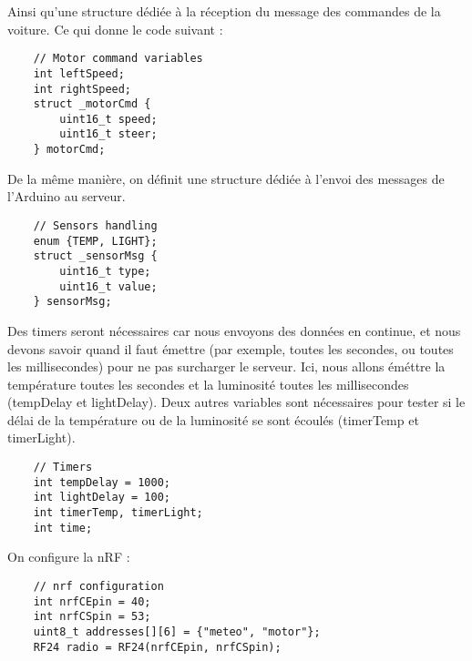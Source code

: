 Ainsi qu'une structure dédiée à la réception du message des commandes
de la voiture. Ce qui donne le code suivant :

\bigbreak
\begin{DDbox}{\linewidth}
\begin{lstlisting}
	// Motor command variables
	int leftSpeed;
	int rightSpeed;
	struct _motorCmd {
		uint16_t speed;
		uint16_t steer;
	} motorCmd;

\end{lstlisting}
\end{DDbox}

De la même manière, on définit une structure dédiée à l'envoi des messages
de l'Arduino au serveur.

\bigbreak
\begin{DDbox}{\linewidth}
\begin{lstlisting}
	// Sensors handling
	enum {TEMP, LIGHT};
	struct _sensorMsg {
		uint16_t type;
		uint16_t value;
	} sensorMsg;

\end{lstlisting}
\end{DDbox}

Des timers seront nécessaires car nous envoyons des données en continue, et nous devons
savoir quand il faut émettre (par exemple, toutes les secondes, ou toutes les millisecondes)
pour ne pas surcharger le serveur. Ici, nous allons éméttre la température toutes les secondes
et la luminosité toutes les millisecondes (tempDelay et lightDelay). 
Deux autres variables sont nécessaires pour tester si le délai de la température ou de la
luminosité se sont écoulés (timerTemp et timerLight).

\bigbreak
\begin{DDbox}{\linewidth}
\begin{lstlisting}
	// Timers
	int tempDelay = 1000;
	int lightDelay = 100;
	int timerTemp, timerLight;
	int time;

\end{lstlisting}
\end{DDbox}

On configure la nRF :

\bigbreak
\begin{DDbox}{\linewidth}
\begin{lstlisting}
	// nrf configuration
	int nrfCEpin = 40;
	int nrfCSpin = 53;
	uint8_t addresses[][6] = {"meteo", "motor"};
	RF24 radio = RF24(nrfCEpin, nrfCSpin);

\end{lstlisting}
\end{DDbox}


